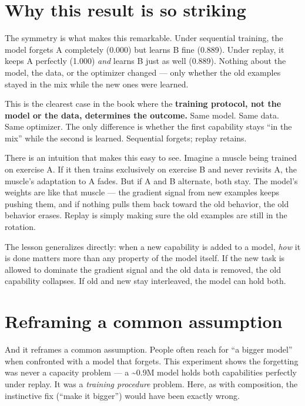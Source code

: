 \section{Why this result is so
striking}\label{why-this-result-is-so-striking}

The symmetry is what makes this remarkable. Under sequential training,
the model forgets A completely (0.000) but learns B fine (0.889). Under
replay, it keeps A perfectly (1.000) \emph{and} learns B just as well
(0.889). Nothing about the model, the data, or the optimizer changed ---
only whether the old examples stayed in the mix while the new ones were
learned.

This is the clearest case in the book where the \textbf{training
protocol, not the model or the data, determines the outcome.} Same
model. Same data. Same optimizer. The only difference is whether the
first capability stays ``in the mix'' while the second is learned.
Sequential forgets; replay retains.

There is an intuition that makes this easy to see. Imagine a muscle
being trained on exercise A. If it then trains exclusively on exercise B
and never revisits A, the muscle's adaptation to A fades. But if A and B
alternate, both stay. The model's weights are like that muscle --- the
gradient signal from new examples keeps pushing them, and if nothing
pulls them back toward the old behavior, the old behavior erases. Replay
is simply making sure the old examples are still in the rotation.

The lesson generalizes directly: when a new capability is added to a
model, \emph{how} it is done matters more than any property of the model
itself. If the new task is allowed to dominate the gradient signal and
the old data is removed, the old capability collapses. If old and new
stay interleaved, the model can hold both.

\section{Reframing a common
assumption}\label{reframing-a-common-assumption}

And it reframes a common assumption. People often reach for ``a bigger
model'' when confronted with a model that forgets. This experiment shows
the forgetting was never a capacity problem --- a \textasciitilde0.9M
model holds both capabilities perfectly under replay. It was a
\emph{training procedure} problem. Here, as with composition, the
instinctive fix (``make it bigger'') would have been exactly wrong.

